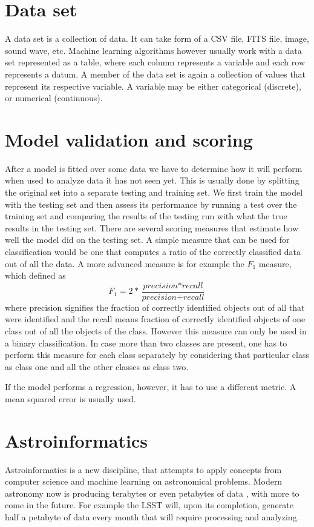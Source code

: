 \documentclass[thesis=B,english]{FITthesis}[2012/10/20]
\begin{document}
\section{Data set}
A data set is a collection of data. It can take form of a CSV file, FITS file, image, sound wave, etc. Machine learning algorithms however usually work with a data set represented as a table, where each column represents a variable and each row represents a datum. A member of the data set is again a collection of values that represent its respective variable. A variable may be either categorical (discrete), or numerical (continuous).

\section{Model validation and scoring}
After a model is fitted over some data we have to determine how it will perform when used to analyze data it has not seen yet. This is usually done by splitting the original set into a separate testing and training set. We first train the model with the testing set and then assess its performance by running a test over the training set and comparing the results of the testing run with what the true results in the testing set. There are several scoring measures that estimate how well the model did on the testing set. A simple measure that can be used for classification would be one that computes a ratio of the correctly classified data out of all the data. A more advanced measure is for example the \(F_1\) measure, which defined as
\[
F_1=2*\frac{\textit{precision}*\textit{recall}}{\textit{precision}+\textit{recall}}
\]
where precision signifies the fraction of correctly identified objects out of all that were identified and the recall means fraction of correctly identified objects of one class out of all the objects of the class. However this measure can only be used in a binary classification. In case more than two classes are present, one has to perform this measure for each class separately by considering that particular class as class one and all the other classes as class two.

If the model performs a regression, however, it has to use a different metric. A mean squared error is usually used.
\section{Astroinformatics}
Astroinformatics is a new discipline, that attempts to apply concepts from computer science and machine learning on astronomical problems. Modern astronomy now is producing terabytes or even petabytes of data \cite{borne2009scientific}, with more to come in the future. For example the LSST will, upon its completion, generate half a petabyte of data every month \cite{becla2006designing} that will require processing and analyzing.
\end{document}
